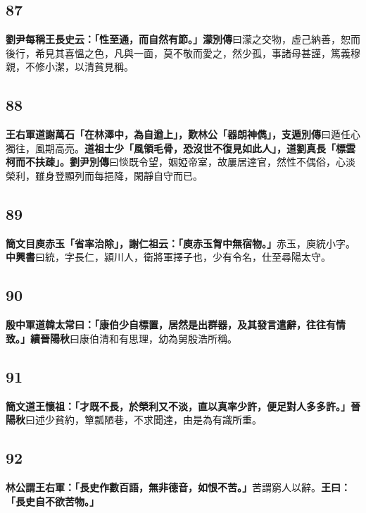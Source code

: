 \subsection*{87}

\textbf{劉尹每稱王長史云：「性至通，而自然有節。」}{\footnotesize \textbf{濛別傳}曰濛之交物，虛己納善，恕而後行，希見其喜慍之色，凡與一面，莫不敬而愛之，然少孤，事諸母甚謹，篤義穆親，不修小潔，以清貧見稱。}

\subsection*{88}

\textbf{王右軍道謝萬石「在林澤中，為自遒上」，歎林公「器朗神儁」，}{\footnotesize \textbf{支遁別傳}曰遁任心獨往，風期高亮。}\textbf{道祖士少「風領毛骨，恐沒世不復見如此人」，道劉真長「標雲柯而不扶疎」。}{\footnotesize \textbf{劉尹別傳}曰惔既令望，姻婭帝室，故屢居達官，然性不偶俗，心淡榮利，雖身登顯列而每挹降，閑靜自守而已。}

\subsection*{89}

\textbf{簡文目庾赤玉「省率治除」，謝仁祖云：「庾赤玉胷中無宿物。」}{\footnotesize 赤玉，庾統小字。\textbf{中興書}曰統，字長仁，潁川人，衛將軍擇子也，少有令名，仕至尋陽太守。}

\subsection*{90}

\textbf{殷中軍道韓太常曰：「康伯少自標置，居然是出群器，及其發言遣辭，往往有情致。」}{\footnotesize \textbf{續晉陽秋}曰康伯清和有思理，幼為舅殷浩所稱。}

\subsection*{91}

\textbf{簡文道王懷祖：「才既不長，於榮利又不淡，直以真率少許，便足對人多多許。」}{\footnotesize \textbf{晉陽秋}曰述少貧約，簞瓢陋巷，不求聞達，由是為有識所重。}

\subsection*{92}

\textbf{林公謂王右軍：「長史作數百語，無非德音，如恨不苦。」}{\footnotesize 苦謂窮人以辭。}\textbf{王曰：「長史自不欲苦物。」}

